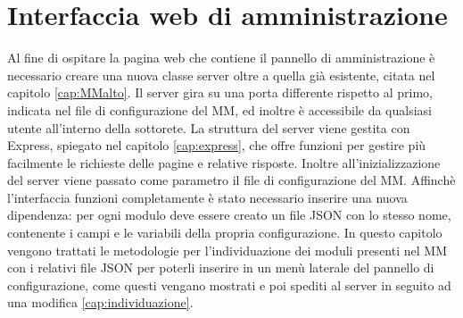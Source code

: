 \chapter{Interfaccia web di amministrazione}\label{capitolo5}
Al fine di ospitare la pagina web che contiene il pannello di amministrazione \`e necessario
creare una nuova classe server oltre a quella gi\`a esistente, citata nel capitolo \ref{cap:MMalto}.
Il server gira su una porta differente rispetto al primo, indicata nel file di configurazione del MM,
ed inoltre \`e accessibile da qualsiasi utente all'interno della sottorete.
La struttura del server viene gestita con Express, spiegato nel capitolo \ref{cap:express}, che offre funzioni per gestire
pi\`u facilmente le richieste delle pagine e relative risposte.
Inoltre all'inizializzazione del server viene passato come parametro il file di configurazione del
MM.
Affinch\`e l'interfaccia funzioni completamente \`e stato necessario inserire una nuova dipendenza:
per ogni modulo deve essere creato un file JSON con lo stesso nome,
contenente i campi e le variabili della propria configurazione.
In questo capitolo vengono trattati le metodologie per l'individuazione dei moduli
presenti nel MM con i relativi file JSON per poterli inserire in un men\`u laterale del
pannello di configurazione, come questi vengano mostrati e poi spediti
al server in seguito ad una modifica \ref{cap:individuazione}.\\[1\baselineskip]


